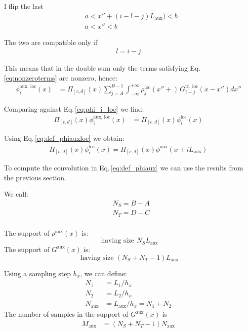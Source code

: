 I flip the last
\begin{align}
& a < x'' +(i-l-j)L_\text{aux}) < b\\
& a < x''< b
\end{align}

The two are compatible only if
\begin{align}
l=i-j
\label{eq:nonzeroterms}
\end{align}

This means that in the double sum only the terms satisfying Eq.\,\ref{eq:nonzeroterms} are nonzero, hence:
\begin{align}
\phi^\text{aux, loc}_i(x)
&=
\Pi_{[c, d]}(x)
\sum_{j=A}^{B-1} \int_{-\infty}^{+\infty}
\rho_{j}^\text{loc}(x'' + )\,
G^\text{tr, loc}_{i-j}(x-x'')
dx''
\end{align}

Comparing against Eq.\,\ref{eq:phi_i_loc}
we find:
\begin{align}
\Pi_{[c, d]}(x)\phi^\text{aux, loc}_i(x)
&=
\Pi_{[c, d]}(x)
\phi^\text{loc}_i(x)
\end{align}

Using Eq.\,\ref{eq:def_phiauxloc} we obtain:
\begin{align}
\Pi_{[c, d]}(x)
\phi^\text{loc}_i(x)
=
\Pi_{[c, d]}(x)\phi^\text{aux}(x + iL_\text{aux}) 
\end{align}

To compute the convolution in Eq.\,\ref{eq:def_phiaux} we can use the results from the previous section.

We call:
\begin{align}
&N_S = B-A\\
&N_T = D-C\\
\end{align}

The support of $\rho^\text{aux}(x)$ is:
\begin{equation}
[a +AL_\text{aux}, a + B L_\text{aux}]
\text{  having size  } N_S  L_\text{aux}
\end{equation}
The support of $G^\text{aux}(x)$ is:
\begin{equation}
[c-b +(C-B+1)L_\text{aux}, c-b + (D-A) L_\text{aux}]
\text{  having size  } \left(N_S + N_T -1\right) L_\text{aux}
\end{equation}

Using a sampling step $h_x$, we can define:
\begin{align}
N_1 &= L_1 / h_x\\
N_2 &= L_2 / h_x\\
N_\text{aux} &= L_\text{aux} / h_x = N_1+N_2
\end{align}
The number of samples in the support of $G^\text{aux}(x)$ is
\begin{align}
M_\text{aux} &= (N_S+N_T-1)N_\text{aux} 
\end{align}



